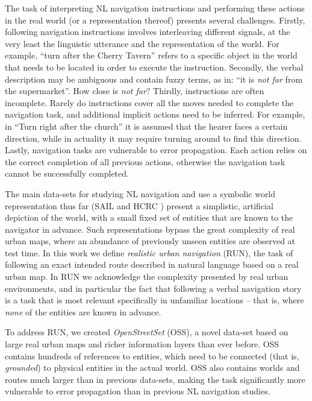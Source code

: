 \documentclass[11pt,a4paper]{article}
\begin{document}
The task of interpreting NL navigation instructions and performing these actions in the real world (or a representation thereof) presents several challenges. Firstly, following navigation instructions involves interleaving different  signals,  at the very least the linguistic utterance and the representation of the world. For example, \enquote {turn after the Cherry Tavern} refers to a specific object in the  world that needs to be located in order to execute the instruction. %
Secondly, the verbal description may be ambiguous and contain fuzzy terms, as in: \enquote {it is {\em  not far} from the supermarket}. How close is {\em not far}? Thirdly,   instructions are often incomplete. Rarely do instructions cover all the moves needed to complete the navigation task, and  additional implicit actions need to be inferred. For example, in ``Turn right after the church'' it is assumed that the hearer faces a certain direction, while in actuality it may require turning around to find this direction. Lastly,
navigation tasks are vulnerable to error propagation. Each action relies on the correct completion of all previous actions, otherwise the navigation task cannot be successfully completed.  \par


The main data-sets for studying  NL navigation and use a symbolic world representation thus far (SAIL \cite{macmahon2006walk} and HCRC \cite{anderson1991hcrc}) present a  simplistic, artificial depiction of the world, with a small fixed set of entities that are known to the navigator in advance. Such representations bypass the great complexity of real urban maps, where an abundance of previously  unseen entities are observed at test time. 
In this work we define  {\em realistic urban navigation} (RUN), the task of following an exact  intended route described in natural language based on a real urban map. In RUN we acknowledge the complexity presented by real urban environments, and in particular the fact that following a verbal  navigation story  is a task that is most relevant specifically in unfamiliar locations -- that is, where {\em none} of the entities are known in advance.

To address  RUN, we created {\em OpenStreetSet} (OSS), a novel data-set based on large real urban maps and richer information layers than ever before. OSS contains hundreds of references to  entities, which need to be connected (that is,  {\em grounded}) to physical entities in the actual world.  %
OSS also contains worlds and routes much larger than in previous data-sets, making the   task significantly more vulnerable to error propagation than in previous NL navigation studies. 
 
\end{document}
